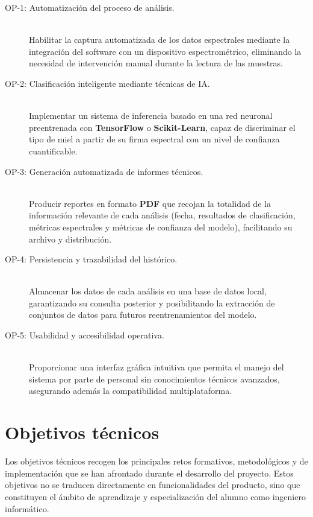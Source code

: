 \begin{description}
    \item[OP-1: Automatización del proceso de análisis.] \leavevmode\\ Habilitar la captura
    automatizada de los datos espectrales mediante la integración del software
    con un dispositivo espectrométrico, eliminando la necesidad de intervención
    manual durante la lectura de las muestras.

    \item[OP-2: Clasificación inteligente mediante técnicas de IA.] \leavevmode\\ Implementar
    un sistema de inferencia basado en una red neuronal preentrenada con
    \textbf{TensorFlow} o \textbf{Scikit-Learn}, capaz de discriminar el tipo de miel a partir de su
    firma espectral con un nivel de confianza cuantificable.

    \item[OP-3: Generación automatizada de informes técnicos.] \leavevmode\\ Producir reportes
    en formato \textbf{PDF} que recojan la totalidad de la información relevante
    de cada análisis (fecha, resultados de clasificación, métricas espectrales y
    métricas de confianza del modelo), facilitando su archivo y distribución.

    \item[OP-4: Persistencia y trazabilidad del histórico.] \leavevmode\\ Almacenar los datos
    de cada análisis en una base de datos local, garantizando su consulta
    posterior y posibilitando la extracción de conjuntos de datos para futuros
    reentrenamientos del modelo.

    \item[OP-5: Usabilidad y accesibilidad operativa.] \leavevmode\\ Proporcionar una interfaz
    gráfica intuitiva que permita el manejo del sistema por parte
    de personal sin conocimientos técnicos avanzados, asegurando además la
    compatibilidad multiplataforma.
\end{description}

\section{Objetivos técnicos}

Los objetivos técnicos recogen los principales retos formativos, metodológicos
y de implementación que se han afrontado durante el desarrollo del proyecto.
Estos objetivos no se traducen directamente en funcionalidades del producto,
sino que constituyen el ámbito de aprendizaje y especialización del alumno como
ingeniero informático.

